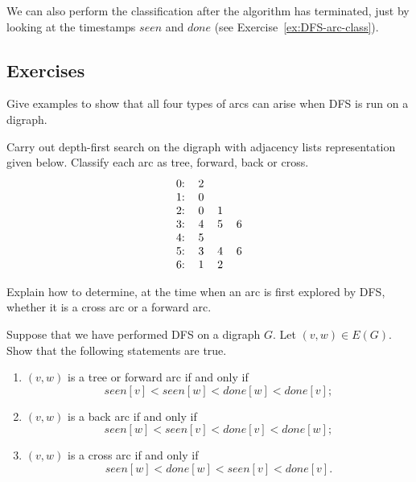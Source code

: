 We can also perform the classification after the algorithm has
terminated, just by looking at the timestamps $seen$ and $done$ (see Exercise~\ref{ex:DFS-arc-class}).  


\subsection*{Exercises}


\begin{Exercise} 
\label{ex:DFS-all-arcs-occur}
Give examples to show that all four types of arcs can arise when DFS is
run on a digraph.
\end{Exercise}

\begin{Exercise}
\label{ex:DFS-doDFS}

Carry out depth-first search on the digraph with adjacency lists
representation  given below. Classify each arc as tree, forward, back or cross.
\newline
$$
\begin{tabular}{ccccc}
0: & 2 &  & \\
1: & 0 & &\\
2: & 0 & 1&\\
3: & 4 & 5 & 6\\
4: & 5 & &\\
5: & 3 & 4 & 6 \\
6: & 1 & 2 & \\
\end{tabular}
$$
\end{Exercise}


\begin{Exercise}
\label{ex:DFS-cross-vs-forward}
Explain how to determine, at the time when an arc is first explored by
DFS, whether it is a cross arc or a forward arc.
\end{Exercise}



\begin{Exercise}
\label{ex:DFS-arc-class}
Suppose that we have performed DFS on a digraph $G$. Let $(v, w)\in
E(G)$. Show that the following statements are true.
\begin{enumerate}
\romenumi
\item
$(v, w)$ is a tree or forward arc if and only if  
$$seen[v] < seen[w] < done[w] < done[v];$$
\item
$(v, w)$ is a back arc if and only if
$$seen[w] <  seen[v] < done[v] < done[w];$$ 
\item
$(v, w)$ is a cross arc if and only if 
$$seen[w] < done[w]  < seen[v] < done[v].$$
\end{enumerate}

\end{Exercise}


